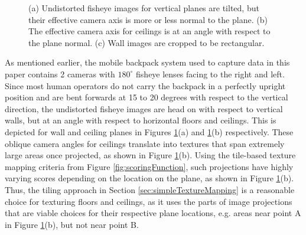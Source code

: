 \documentclass[10pt,twocolumn,letterpaper]{article}
\begin{document}
\begin{figure}
  \centering
  \centering
  \centering
  \caption{(a) Undistorted fisheye images for vertical planes are
    tilted, but their effective camera axis is more or less normal to
    the plane. (b) The effective camera axis for ceilings is at an
    angle with respect to the plane normal. (c) Wall images are
    cropped to be rectangular.}
  \label{fig:projectionAngles}
\end{figure}



As mentioned earlier, the mobile backpack system used to capture data
in this paper contains 2 cameras with $180^\circ$ fisheye lenses
facing to the right and left. Since most human operators do not carry
the backpack in a perfectly upright position and are bent forwards at
15 to 20 degrees with respect to the vertical direction, the
undistorted fisheye images are head on with respect to vertical walls,
but at an angle with respect to horizontal floors and ceilings. This
is depicted for wall and ceiling planes in Figures
\ref{fig:projectionAngles}(a) and \ref{fig:projectionAngles}(b)
respectively. These oblique camera angles for ceilings translate into
textures that span extremely large areas once projected, as shown in
Figure \ref{fig:projectionAngles}(b). Using the tile-based texture
mapping criteria from Figure \ref{fig:scoringFunction}, such
projections have highly varying scores depending on the location on
the plane, as shown in Figure \ref{fig:projectionAngles}(b). Thus, the
tiling approach in Section \ref{sec:simpleTextureMapping} is a
reasonable choice for texturing floors and ceilings, as it uses the
parts of image projections that are viable choices for their
respective plane locations, e.g. areas near point A in Figure
\ref{fig:projectionAngles}(b), but not near point B.
\end{document}
